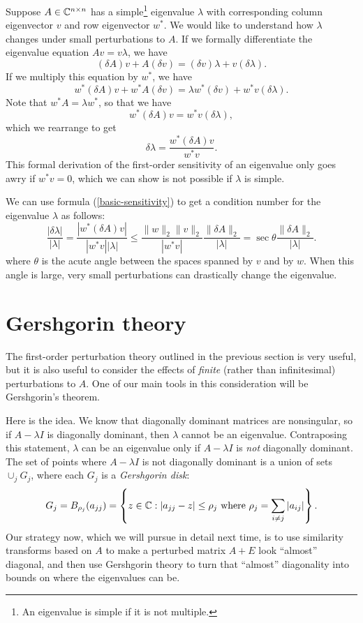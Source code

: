 \documentclass[12pt, leqno]{article} %
\begin{document}
Suppose $A \in \mathbb{C}^{n \times n}$ has a simple\footnote{
  An eigenvalue is simple if it is not multiple.
} eigenvalue $\lambda$ with corresponding column
eigenvector $v$ and row eigenvector $w^*$.
We would like to understand how $\lambda$ changes under
small perturbations to $A$.  If we formally differentiate
the eigenvalue equation $A v = v \lambda$, we have
\[
  (\delta A) v + A (\delta v) = (\delta v) \lambda + v (\delta \lambda).
\]
If we multiply this equation by $w^*$, we have
\[
  w^* (\delta A) v + w^* A (\delta v) =
  \lambda w^* (\delta v) + w^* v (\delta \lambda).
\]
Note that $w^* A = \lambda w^*$, so that we have
\[
  w^* (\delta A) v = w^* v (\delta \lambda),
\]
which we rearrange to get
\begin{equation} \label{basic-sensitivity}
  \delta \lambda = \frac{w^* (\delta A) v}{w^* v}.
\end{equation}
This formal derivation of the first-order sensitivity of an
eigenvalue only goes awry if $w^* v = 0$, which we can show is
not possible if $\lambda$ is simple.

We can use formula (\ref{basic-sensitivity}) to get a condition
number for the eigenvalue $\lambda$ as follows:
\[
  \frac{|\delta \lambda|}{|\lambda|}
   = \frac{|w^* (\delta A) v|}{|w^* v| |\lambda|}
    \leq \frac{\|w\|_2 \|v\|_2}{|w^* v|} \frac{\|\delta A\|_2}{|\lambda|}
    = \sec \theta \frac{\|\delta A\|_2}{|\lambda|}.
\]
where $\theta$ is the acute angle between the spaces spanned by $v$ and by $w$.
When this angle is large, very small perturbations can drastically change the
eigenvalue.

\section{Gershgorin theory}

The first-order perturbation theory outlined in the previous section
is very useful, but it is also useful to consider the effects of
{\em finite} (rather than infinitesimal) perturbations to $A$.  One of
our main tools in this consideration will be Gershgorin's theorem.

Here is the idea.  We know that diagonally dominant matrices are nonsingular,
so if $A - \lambda I$ is diagonally dominant, then $\lambda$ cannot be an
eigenvalue.  Contraposing this statement, $\lambda$ can be an
eigenvalue only if $A - \lambda I$ is {\em not} diagonally dominant.
The set of points where $A - \lambda I$ is not diagonally dominant is
a union of sets $\cup_j G_j$, where each $G_j$ is a {\em Gershgorin disk}:
\[
  G_j = B_{\rho_j}(a_{jj}) =
  \left\{
    z \in \mathbb{C} : |a_{jj}-z| \leq \rho_j \mbox{ where }
    \rho_j = \sum_{i \neq j} |a_{ij}|
  \right\}.
\]
Our strategy now, which we will pursue in detail next time, is to use
similarity transforms based on $A$ to make a perturbed matrix $A+E$
look ``almost'' diagonal, and then use Gershgorin theory to turn that
``almost'' diagonality into bounds on where the eigenvalues can be.
\end{document}
